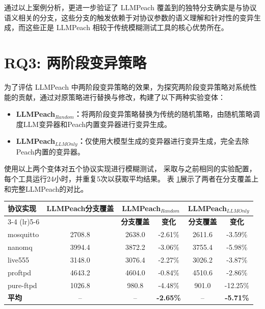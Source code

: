 通过以上案例分析，更进一步验证了 LLMPeach 覆盖到的独特分支确实是与协议语义相关的分支，这些分支的触发依赖于对协议参数的语义理解和针对性的变异生成，而这些正是 LLMPeach 相较于传统模糊测试工具的核心优势所在。

\section{RQ3: 两阶段变异策略}

为了评估 LLMPeach 中两阶段变异策略的效果，为探究两阶段变异策略对系统性能的贡献，通过对原策略进行替换与修改，构建了以下两种实验变体：
\begin{itemize}
    \item \textbf{LLMPeach$_{Random}$：}将两阶段变异策略替换为传统的随机策略，由随机策略调度LLM变异器和Peach内置变异器进行变异生成。
    \item \textbf{LLMPeach$_{LLMOnly}$：}仅使用大模型生成的变异器进行变异生成，完全去除Peach内置的变异器。
\end{itemize}

使用以上两个变体对五个协议实现进行模糊测试，
采取与之前相同的实验配置，每个工具运行24小时，并重复5次以获取平均结果。
表 \ref{tab:ablation}展示了两者在分支覆盖上和完整LLMPeach的对比。

\begin{table}[H]
\centering
{}
\label{tab:ablation}
\begin{tabular}{lccccc}
\toprule
\multirow{2}{*}{\textbf{协议实现}}
& \multirow{2}{*}{\textbf{LLMPeach分支覆盖}}   
& \multicolumn{2}{c}{\textbf{LLMPeach$_{Random}$}} 
& \multicolumn{2}{c}{\textbf{LLMPeach$_{LLMOnly}$}} \\
\cmidrule(lr){3-4} \cmidrule(lr){5-6}
& & \textbf{分支覆盖} & \textbf{变化} & \textbf{分支覆盖} & \textbf{变化} \\
\midrule
mosquitto & 2708.8 & 2638.0 & -2.61\% & 2611.6 & -3.59\% \\
nanomq    & 3994.4 & 3872.2 & -3.06\% & 3755.4 & -5.98\% \\
live555   & 3148.0 & 3076.4 & -2.27\% & 3026.2 & -3.87\% \\
proftpd   & 4643.2 & 4604.0 & -0.84\% & 4510.6 & -2.86\% \\
pure-ftpd & 1026.8 & 980.8  & -4.48\% & 901.0  & -12.25\% \\
\midrule
\textbf{平均} & -- & -- & \textbf{-2.65\%} & -- & \textbf{-5.71\%} \\
\bottomrule
\end{tabular}
\end{table}

